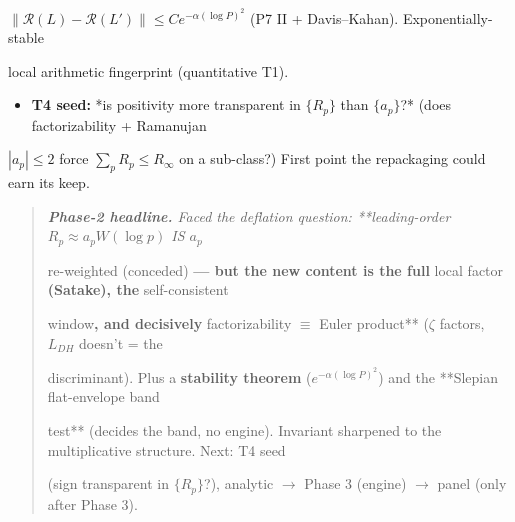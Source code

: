 \documentclass[10pt]{article}
\begin{document}
  $\|\mathcal R(L)-\mathcal R(L')\|\le C e^{-\alpha(\log P)^2}$ (P7 II + Davis--Kahan). Exponentially-stable\par
  local arithmetic fingerprint (quantitative T1).\par
\begin{itemize}
\item \textbf{T4 seed:} *is positivity more transparent in $\{R_p\}$ than $\{a_p\}$?* (does factorizability + Ramanujan
\end{itemize}
  $|a_p|\le2$ force $\sum_p R_p\le R_\infty$ on a sub-class?) First point the repackaging could earn its keep.\par

\begin{quote}\itshape
\textbf{Phase-2 headline.} Faced the deflation question: **leading-order $R_p\approx a_p W(\log p)$ IS $a_p$\par
re-weighted (conceded)\textbf{ --- but the new content is the full }local factor\textbf{ (Satake), the }self-consistent\par
window\textbf{, and decisively }factorizability $\equiv$ Euler product** (\ensuremath{\zeta} factors, $L_{DH}$ doesn't = the\par
discriminant). Plus a \textbf{stability theorem} ($e^{-\alpha(\log P)^2}$) and the **Slepian flat-envelope band\par
test** (decides the band, no engine). Invariant sharpened to the multiplicative structure. Next: T4 seed\par
(sign transparent in $\{R_p\}$?), analytic \ensuremath{\to} Phase 3 (engine) \ensuremath{\to} panel (only after Phase 3).\par
\end{quote}
\end{document}
